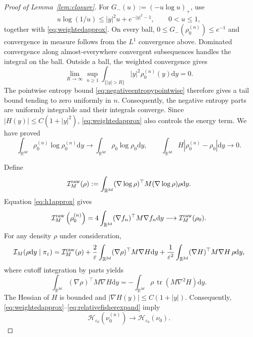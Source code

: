 \documentclass[11pt]{article}
\theoremstyle{definition}
\newcommand{\R}{\mathbb R}
\newcommand{\dd}{\mathrm d}
\newcommand{\cH}{\mathcal H}
\newcommand{\cI}{\mathcal I}
\newcommand{\eps}{\varepsilon}
\begin{document}
\begin{proof}[Proof of Lemma~\ref{lem:closure}]
For $G_-(u):=(-u\log u)_+$, use
\begin{equation}\label{eq:negativeentropypointwise}
 u\log(1/u)\leq |y|^2u+e^{-|y|^2-1},
 \qquad 0<u\leq1,
\end{equation}
together with \eqref{eq:weightedapprox}. On every ball,
$0\leq G_-\left(\rho_0^{(n)}\right)\leq e^{-1}$ and convergence in measure follows from
the $L^1$ convergence above. Dominated convergence along almost-everywhere
convergent subsequences handles the integral on the ball. Outside a ball, the
weighted convergence gives
\[
 \lim_{R\to\infty}\sup_{n\geq1}
 \int_{\{|y|>R\}}|y|^2\rho_0^{(n)}(y)\dd y=0.
\]
The pointwise entropy bound \eqref{eq:negativeentropypointwise}
therefore gives a tail bound tending to zero
uniformly in $n$. Consequently, the negative entropy parts are uniformly
integrable and their integrals converge. Since
$|H(y)|\leq C(1+|y|^2)$, \eqref{eq:weightedapprox} also controls the energy
term. We have proved
\begin{equation}\label{eq:entropyapprox}
 \int_{\R^{3d}}\rho_0^{(n)}\log\rho_0^{(n)}\dd y
 \longrightarrow \int_{\R^{3d}}\rho_0\log\rho_0\dd y,
 \qquad
 \int_{\R^{3d}} H\left|\rho_0^{(n)}-\rho_0\right|\dd y\longrightarrow0.
\end{equation}

Define
\[
 \cI_M^{\rm raw}(\rho):=\int_{\R^{3d}}(\nabla\log\rho)^\top
 M(\nabla\log\rho)\rho\dd y.
\]
Equation \eqref{eq:h1approx} gives
\[
 \cI_M^{\rm raw}\left(\rho_0^{(n)}\right)
 =4\int_{\R^{3d}}(\nabla f_n)^\top M\nabla f_n\dd y
 \longrightarrow\cI_M^{\rm raw}(\rho_0).
\]
For any density $\rho$ under consideration,
\begin{align}\label{eq:relativefisherexpand}
 \cI_M(\rho\dd y\mid\pi_\eps)
 =\cI_M^{\rm raw}(\rho)
 +\frac{2}{\eps}\int_{\R^{3d}}(\nabla\rho)^\top M\nabla H\dd y
 +\frac{1}{\eps^2}\int_{\R^{3d}}(\nabla H)^\top M\nabla H\,\rho\dd y,
\end{align}
where cutoff integration by parts yields
\[
 \int_{\R^{3d}}(\nabla\rho)^\top M\nabla H\dd y
 =-\int_{\R^{3d}}\rho\,\operatorname{tr}\left(M\nabla^2H\right)\dd y.
\]
The Hessian of $H$ is bounded and $|\nabla H(y)|\leq C(1+|y|)$.
Consequently, \eqref{eq:weightedapprox}--\eqref{eq:relativefisherexpand}
imply
\begin{equation}\label{eq:functionalapprox}
 \cH_{\eps_0}\left(\nu_0^{(n)}\right)\longrightarrow
 \cH_{\eps_0}(\nu_0).
\end{equation}


\end{proof}
\end{document}
